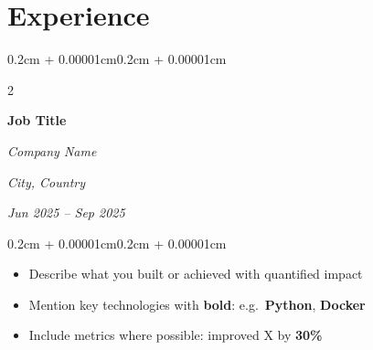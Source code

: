 \documentclass[10pt, a4paper]{article}
\newlength{\entryspacing}
\newlength{\highlightspacing}
\newenvironment{highlights}{
    \begin{itemize}[
        topsep=\highlightspacing,
        parsep=\highlightspacing,
        partopsep=0pt,
        itemsep=0pt,
        leftmargin=0.4cm + 10pt
    ]
}{
    \end{itemize}
}
\newenvironment{onecolentry}{
    \begin{adjustwidth}{0.2cm + 0.00001cm}{0.2cm + 0.00001cm}
}{
    \end{adjustwidth}
}
\newenvironment{twocolentry}[2][]{
    \onecolentry
    \def\secondColumn{#2}
    \setcolumnwidth{\fill, 4.5cm}
    \begin{paracol}{2}
}{
    \switchcolumn \raggedleft \secondColumn
    \end{paracol}
    \endonecolentry
}
\newcommand{\entrybreak}{\vspace{\entryspacing}}
\newcommand{\educationentry}[4]{
    \begin{twocolentry}{\textit{#1}}
        \textbf{#2}
        
        \textit{#3}
    \end{twocolentry}
    \vspace{\highlightspacing}
    \begin{onecolentry}
        \begin{highlights}
            #4
        \end{highlights}
    \end{onecolentry}
}
\newcommand{\experienceentry}[5]{
    \begin{twocolentry}{
        \textit{#1}
        
        \textit{#2}
    }
        \textbf{#3}
        
        \textit{#4}
    \end{twocolentry}
    \vspace{\highlightspacing}
    \begin{onecolentry}
        \begin{highlights}
            #5
        \end{highlights}
    \end{onecolentry}
}
\newcommand{\techentry}[2]{
    \begin{onecolentry}
        \textbf{#1:} #2
    \end{onecolentry}
}
\begin{document}
%

\section{Experience}

\experienceentry{City, Country}{Jun 2025 – Sep 2025}
    {Job Title}
    {Company Name}
    {
        \item Describe what you built or achieved with quantified impact
        \item Mention key technologies with \textbf{bold}: e.g.\ \textbf{Python}, \textbf{Docker}
        \item Include metrics where possible: improved X by \textbf{30\%}
    }

%

%

\end{document}
